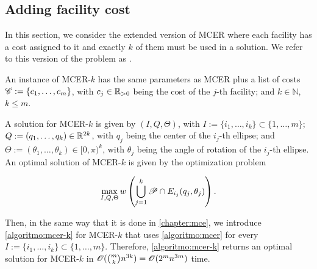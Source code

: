 \subsection{Adding facility cost}

In this section, we consider the extended version of MCER where each facility has a cost assigned to it and exactly $k$ of them must be used in a solution. We refer to this version of the problem as . 

An instance of MCER-$k$ has the same parameters as MCER plus a list of costs \mbox{$\mathscr{C}:=\{c_1, \dots, c_m\}$}, with $c_j\in\mathbb{R}_{>0}$ being the cost of the $j$-th facility; and $k\in\mathbb{N}$, $k\le m$.

A solution for MCER-$k$ is given by $(I, Q, \Theta)$, with $I:=\{i_1, \dots, i_k\}\subset \{1, \dots, m\}$; \\\mbox{$Q:=(q_1, \dots, q_k)\in\mathbb{R}^{2k}$}, with $q_j$ being the center of the $i_j$-th ellipse; and \mbox{$\Theta:=(\theta_1, \dots, \theta_k) \in [0, \pi)^k$}, with $\theta_j$ being the angle of rotation of the $i_j$-th ellipse. An optimal solution of MCER-$k$ is given by the optimization problem

\begin{equation*}
	\max_{I, Q, \Theta} w\left(\bigcup_{j=1}^k \mathscr{P} \cap E_{i_j}(q_j, \theta_j)\right).
\end{equation*}

Then, in the same way that it is done in \autoref{chapter:mce}, we introduce \autoref{algoritmo:mcer-k} for MCER-$k$ that uses \autoref{algoritmo:mcer} for every $I:=\{i_1, \dots, i_k\} \subset \{1, \dots, m\}$. Therefore, \autoref{algoritmo:mcer-k} returns an optimal solution for MCER-$k$ in $\mathscr{O}(\binom{m}{k}n^{3k}) = \mathscr{O}(2^mn^{3m})$ time.

